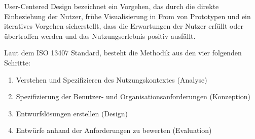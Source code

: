\begin{definition}

User-Centered Design bezeichnet ein Vorgehen, das durch die direkte Einbeziehung der Nutzer, frühe Visualisierung in From von Prototypen und ein iteratives Vorgehen sicherstellt, dass die Erwartungen der Nutzer erfüllt oder übertroffen werden und das Nutzungserlebnis positiv ausfällt. \citet{weichert_quick_2021}

\end{definition} 

Laut dem ISO 13407 Standard, besteht die Methodik aus den vier folgenden Schritte:

\begin{enumerate}
	\item Verstehen und Spezifizieren des Nutzungskontextes (Analyse)
	\item Spezifizierung der Benutzer- und Organisationsanforderungen (Konzeption)
	\item Entwurfslösungen erstellen (Design)
	\item Entwürfe anhand der Anforderungen zu bewerten (Evaluation)
\end{enumerate}
